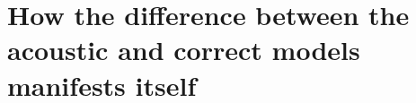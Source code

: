 















\section{How the difference between the acoustic and correct models manifests itself}

